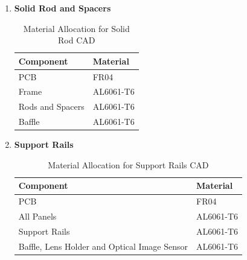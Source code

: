 \documentclass[../../main.tex]{subfiles}
\begin{document}
    
    \begin{enumerate}
        \item \textbf{Solid Rod and Spacers}
        \begin{table}[h!]
            \centering
            \begin{tabular}{|p{6cm}|p{3cm}|}
                \hline
                \textbf{Component} & \textbf{Material} \\
                \hline
                PCB & FR04 \\
                \hline
                Frame & AL6061-T6 \\
                \hline
                Rods and Spacers & AL6061-T6 \\
                \hline
                Baffle & AL6061-T6 \\
                \hline
            \end{tabular}
            \caption{Material Allocation for Solid Rod CAD}
            \label{tab:my_label}
        \end{table}
        \item \textbf{Support Rails}
        \begin{table}[H]
            \centering
            \begin{tabular}{|p{6cm}|p{3cm}|}
                \hline
                \textbf{Component} & \textbf{Material} \\
                \hline
                PCB & FR04 \\
                \hline
                All Panels & AL6061-T6 \\
                \hline
                Support Rails & AL6061-T6 \\
                \hline
                Baffle, Lens Holder and Optical Image Sensor & AL6061-T6 \\
                \hline    
            \end{tabular}
            \caption{Material Allocation for Support Rails CAD}
            \label{tab:my_label}
        \end{table}
    \end{enumerate}
\end{document}
